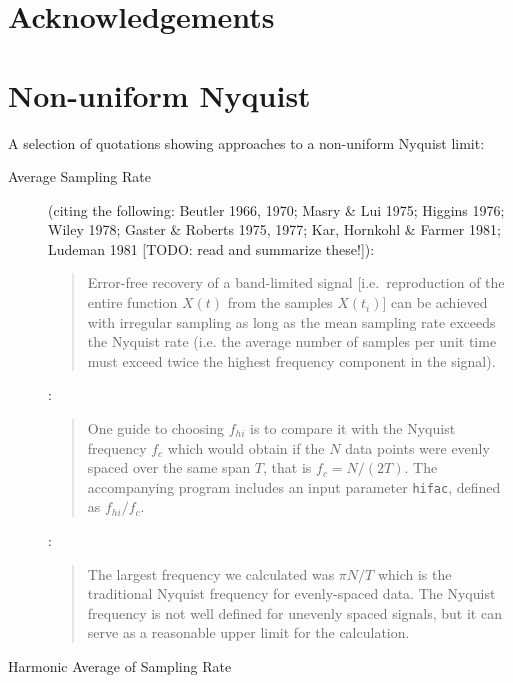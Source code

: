 \documentclass[preprint]{aastex}
\newcommand{\todo}[1]{{\color{red} [TODO: #1]}}
\begin{document}
\section{Acknowledgements}

\citet{Astropy2013}




\appendix

\section{Non-uniform Nyquist}
A selection of quotations showing approaches to a non-uniform Nyquist limit:

\begin{description}

\item[Average Sampling Rate]

\citet{Scargle82} (citing the following: Beutler 1966, 1970; Masry \& Lui 1975; Higgins 1976; Wiley 1978; Gaster \& Roberts 1975, 1977; Kar, Hornkohl \& Farmer 1981; Ludeman 1981 \todo{read and summarize these!}):
\begin{quote}
Error-free recovery of a band-limited signal [i.e.~reproduction of the entire function $X(t)$ from the samples $X(t_i)$] can be achieved with irregular sampling as long as the mean sampling rate exceeds the Nyquist rate (i.e. the average number of samples per unit time must exceed twice the highest frequency component in the signal).
\end{quote}

\citet{NumRec}: 
\begin{quote}
One guide to choosing $f_{hi}$ is to compare it with the Nyquist frequency $f_c$ which would obtain if the $N$ data points were evenly spaced over the same span $T$, that is $f_c = N/(2T)$. The accompanying program includes an input parameter {\tt hifac}, defined as $f_{hi}/f_{c}$.
\end{quote}

\citet{Horne86}:
\begin{quote}
The largest frequency we calculated was $\pi N/T$ which
is the traditional Nyquist frequency for evenly-spaced data. The Nyquist
frequency is not well defined for unevenly spaced signals, but it can serve as
a reasonable upper limit for the calculation.
\end{quote}

\item[Harmonic Average of Sampling Rate]


\end{description}
\end{document}
